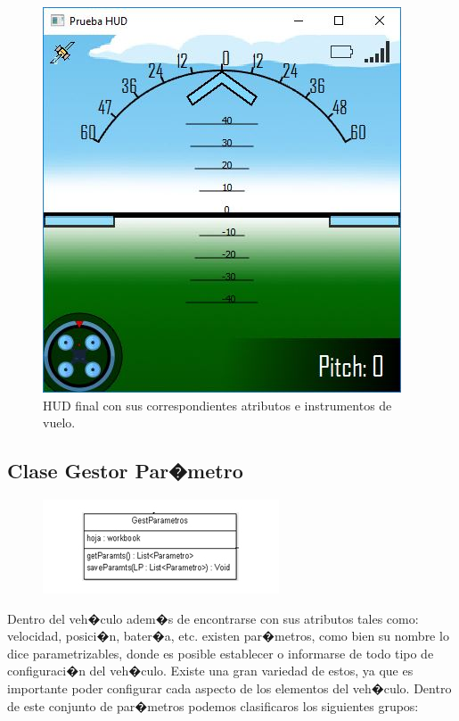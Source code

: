 \begin{enumerate}
\begin{itemize}
	\end{itemize}  
	
	
	\begin{figure}[h]
		\centering
		\includegraphics[width=0.7\linewidth, height=0.4\textheight]{Imagenes/HUD_beta}
		\caption{HUD final con sus correspondientes atributos e  instrumentos de vuelo.}
		\label{fig:hudbeta}
	\end{figure}
	
	
	
	
\end{enumerate}%

\newpage


\subsection{Clase Gestor Par�metro}

\begin{figure}[h]
	\centering
	\includegraphics[width=0.4\linewidth, height=0.2\textheight]{Imagenes/classGestParametro}
	\caption{}
	\label{fig:classgestparametro}
\end{figure}

Dentro del veh�culo adem�s de encontrarse con sus atributos tales como: velocidad, posici�n, bater�a, etc. existen par�metros, como bien su nombre lo dice parametrizables, donde es posible establecer o informarse de todo tipo de configuraci�n del veh�culo. Existe una gran variedad de estos, ya que es importante poder configurar cada aspecto de los elementos del veh�culo. Dentro de este conjunto de par�metros podemos clasificaros los siguientes grupos:

